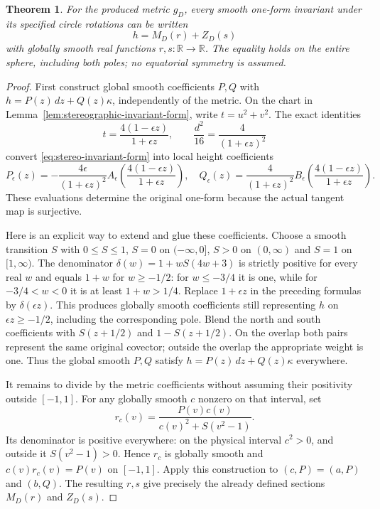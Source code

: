\documentclass[11pt]{article}
\newtheorem{theorem}{Theorem}[section]
\newcommand{\R}{\mathbb R}
\begin{document}
\begin{theorem}\label{thm:invariant-one-form-classification}
For the produced metric $g_D$, every smooth one-form invariant under its
specified circle rotations can be written
\[
 h=M_D(r)+Z_D(s)
\]
with globally smooth real functions $r,s:\R\to\R$. The equality holds
on the entire sphere, including both poles; no equatorial symmetry is assumed.
\end{theorem}

\begin{proof}
First construct global smooth coefficients $P,Q$ with $h=P(z)\,dz+Q(z)\kappa$,
independently of the metric. On the chart in
Lemma~\ref{lem:stereographic-invariant-form}, write $t=u^2+v^2$.
The exact identities
\[
 t=\frac{4(1-\epsilon z)}{1+\epsilon z},\qquad
 \frac{d^2}{16}=\frac{4}{(1+\epsilon z)^2}
\]
convert \eqref{eq:stereo-invariant-form} into local height coefficients
\[
 P_\epsilon(z)=-\frac{4\epsilon}{(1+\epsilon z)^2}
 A_\epsilon\!\left(\frac{4(1-\epsilon z)}{1+\epsilon z}\right),\quad
 Q_\epsilon(z)=\frac{4}{(1+\epsilon z)^2}
 B_\epsilon\!\left(\frac{4(1-\epsilon z)}{1+\epsilon z}\right).
\]
These evaluations determine the original one-form because the actual
tangent map is surjective.

Here is an explicit way to extend and glue these coefficients. Choose a smooth
transition $S$ with $0\leq S\leq1$, $S=0$ on $(-\infty,0]$, $S>0$ on
$(0,\infty)$ and $S=1$ on $[1,\infty)$. The denominator
$\delta(w)=1+wS(4w+3)$ is strictly positive for every real $w$ and equals
$1+w$ for $w\geq-1/2$: for $w\leq-3/4$ it is one, while for
$-3/4<w<0$ it is at least $1+w>1/4$.
Replace $1+\epsilon z$ in the preceding formulas by $\delta(\epsilon z)$.
This produces globally smooth coefficients still representing $h$ on
$\epsilon z\geq-1/2$, including the corresponding pole. Blend the north
and south coefficients with $S(z+1/2)$ and $1-S(z+1/2)$.
On the overlap both pairs represent the same original covector; outside
the overlap the appropriate weight is one. Thus the global smooth $P,Q$
satisfy $h=P(z)\,dz+Q(z)\kappa$ everywhere.

It remains to divide by the metric coefficients without assuming their
positivity outside $[-1,1]$. For any globally smooth $c$ nonzero on that
interval, set
\[
 r_c(v)=\frac{P(v)c(v)}{c(v)^2+S(v^2-1)}.
\]
Its denominator is positive everywhere: on the physical interval $c^2>0$,
and outside it $S(v^2-1)>0$. Hence $r_c$ is globally smooth and $c(v)r_c(v)=P(v)$
on $[-1,1]$. Apply this construction to $(c,P)=(a,P)$ and $(b,Q)$.
The resulting $r,s$ give precisely the already defined sections
$M_D(r)$ and $Z_D(s)$.
\end{proof}
\end{document}
